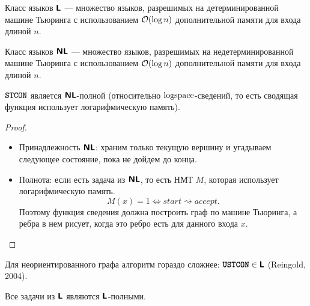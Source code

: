 \begin{defn}[$ \L$ и $ \NL$]
	\index{\L}
   Класс языков $ \L$ --- множество языков, разрешимых на детерминированной машине Тьюринга с использованием $\mathcal{O}(\log n)$ дополнительной памяти для входа длиной $ n$. 
   
   \noindent
   \index{\NL}
	Класс языков $\NL$ --- множество языков, разрешимых на недетерминированной машине Тьюринга с использованием $\mathcal{O}(\log n)$ дополнительной памяти для входа длиной $n$.
\end{defn}
\begin{lm}
	$ {\textbf{\texttt{STCON}}}$ является $ \NL$-полной (относительно $ \textmd{logspace}$-сведений, то есть сводящая функция использует логарифмическую память).
\end{lm}
\begin{proof}
	\begin{itemize}
		\item Принадлежность $ \NL$: храним только текущую вершину и угадываем следующее состояние, пока не дойдем до конца.
		\item Полнота: если есть задача из $ \NL$, то есть НМТ $ M$, которая использует логарифмическую память. 
			\[
				M(x) = 1 \Longleftrightarrow start \rightsquigarrow accept
			.\] 
			Поэтому функция сведения должна построить граф по машине Тьюринга, а ребра в нем рисует, когда это ребро есть для данного входа $ x$.
    \end{itemize}
\end{proof}
\begin{st}
	Для неориентированного графа алгоритм гораздо сложнее: $ {\textbf{\texttt{USTCON}}} \in \textmd{\textbf{\textsf{L}}}$ (Reingold, 2004).
\end{st}
\begin{st}
	Все задачи из $ \L$ являются  $ \L$-полными.
\end{st}

